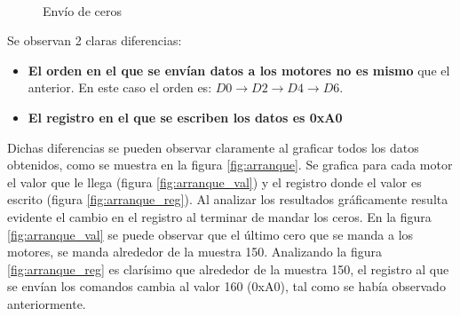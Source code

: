 \documentclass[main]{subfiles}
\begin{document}
\begin{figure} [h!]
\centering
   \\
  \caption{Envío de ceros}
  \label{fig:snif_arranque_cerca}
\end{figure}

Se observan 2 claras diferencias:
\begin{itemize}
\item \textbf{El orden en el que se envían datos a los motores no es mismo} que el anterior. En este caso el orden es: $D0\rightarrow D2\rightarrow D4\rightarrow D6$.
\item \textbf{El registro en el que se escriben los datos es 0xA0}
\end{itemize}

Dichas diferencias se pueden observar claramente al graficar todos los datos obtenidos, como se muestra en la figura \ref{fig:arranque}. Se grafica para cada motor el valor que le llega (figura \ref{fig:arranque_val}) y el registro donde el valor es escrito (figura \ref{fig:arranque_reg}). Al analizar los resultados gráficamente resulta evidente el cambio en el registro al terminar de mandar los ceros. En la figura \ref{fig:arranque_val} se puede observar que el último cero que se manda a los motores, se manda alrededor de la muestra 150. Analizando la figura \ref{fig:arranque_reg} es clarísimo que alrededor de la muestra 150, el registro al que se envían los comandos cambia al valor 160 (0xA0), tal como se había observado anteriormente.
\end{document}
